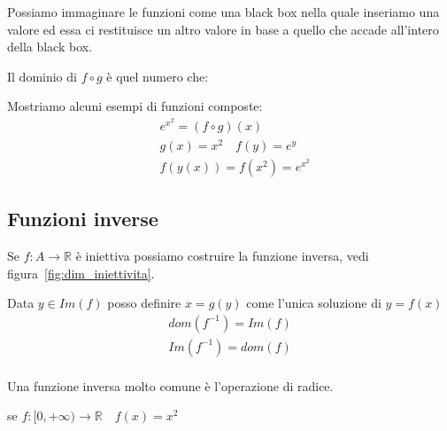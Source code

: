 \documentclass[../main.tex, class=article, 12pt]{subfiles}
\begin{document}
\begin{tcolorbox}
Possiamo immaginare le funzioni come una black box nella quale inseriamo una valore ed essa ci restituisce un altro valore in base a quello che accade all'intero della black box.
\end{tcolorbox}


Il dominio di $ f \circ g $ è quel numero che:

\begin{exmp}
        Mostriamo alcuni esempi di funzioni composte:
        \begin{align*}
                & e^{x^2} = (f \circ g)(x) \\
                & g(x) = x^2 \quad f(y) = e^y \\
                & f(y(x)) = f(x^2) = e^{x^2}
        \end{align*}
\end{exmp}



\newpage
\subsection{Funzioni inverse}\label{sec:funzione_inversa}
Se $ f : A \to \mathbb{R} $ è iniettiva possiamo costruire la funzione inversa, vedi figura~\ref{fig:dim_iniettivita}. \par
Data $ y \in Im(f) $ posso definire $ x = g(y) $ come l'unica soluzione di $ y = f(x) $
\begin{align*}
        dom(f^{-1}) = Im(f) \\
        Im(f^{-1}) = dom(f) \\
\end{align*}

Una funzione inversa molto comune è l'operazione di radice.

\begin{exmp}
        se $ f : [0, +\infty) \to \mathbb{R} \quad  f(x) = x^2$

        
\end{exmp}
\end{document}
